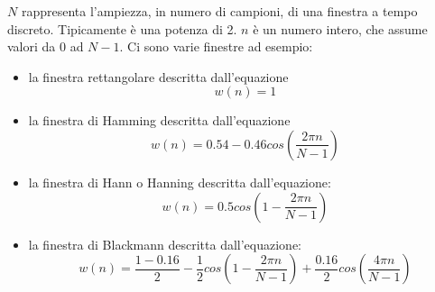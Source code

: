 $N$ rappresenta l'ampiezza, in numero di campioni, di una finestra a tempo discreto. Tipicamente \`e una potenza di 2. $n$ \`e un numero intero, che assume valori da $0$ ad $N-1$. Ci sono varie finestre ad esempio: 
\begin{itemize}
  \item 
    la finestra rettangolare descritta dall'equazione 
    \[
      w(n)=1  
    \]
  \item
    la finestra di Hamming descritta dall'equazione
    \[
    w(n)=0.54-0.46 cos \left(\frac{2 \pi n}{N-1}\right)
    \]
  \item
    la finestra di Hann o Hanning descritta dall'equazione:
    \[
      w(n)=0.5 cos \left(1-\frac{2 \pi n}{N-1}\right)
    \]
  \item
    la finestra di Blackmann descritta dall'equazione:
    \[
      w(n)=\frac{1-0.16}{2} - \frac{1}{2} cos \left(1-\frac{2 \pi n}{N-1}\right) + \frac{0.16}{2} cos \left(\frac{4 \pi n}{N-1}\right)
    \]
\end{itemize}


\fi